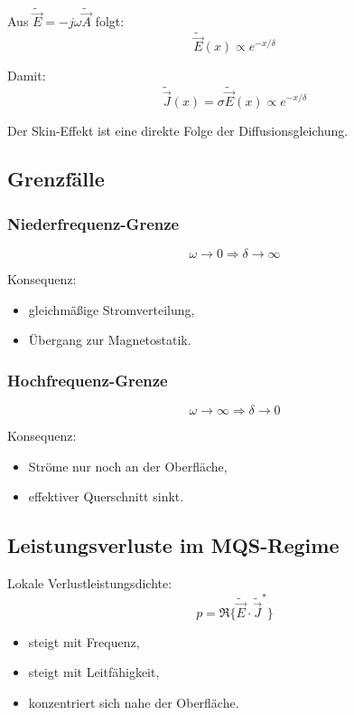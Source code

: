 \documentclass[a4paper]{article}
\newcommand{\E}{\vec E}
\newcommand{\J}{\vec J}
\newcommand{\A}{\vec A}
\begin{document}
Aus $\tilde{\E}=-j\omega\tilde{\A}$ folgt:
\[
\tilde{\E}(x) \propto e^{-x/\delta}
\]

Damit:
\[
\tilde{\J}(x) = \sigma \tilde{\E}(x) \propto e^{-x/\delta}
\]

\begin{schema}
Der Skin-Effekt ist eine direkte Folge der Diffusionsgleichung.
\end{schema}

\subsection{Grenzfälle}

\subsubsection{Niederfrequenz-Grenze}

\[
\omega \to 0 \Rightarrow \delta \to \infty
\]

Konsequenz:
\begin{itemize}
  \item gleichmäßige Stromverteilung,
  \item Übergang zur Magnetostatik.
\end{itemize}

\subsubsection{Hochfrequenz-Grenze}

\[
\omega \to \infty \Rightarrow \delta \to 0
\]

Konsequenz:
\begin{itemize}
  \item Ströme nur noch an der Oberfläche,
  \item effektiver Querschnitt sinkt.
\end{itemize}

\subsection{Leistungsverluste im MQS-Regime}

Lokale Verlustleistungsdichte:
\[
p = \Re\{\tilde{\E}\cdot\tilde{\J}^*\}
\]

\begin{itemize}
  \item steigt mit Frequenz,
  \item steigt mit Leitfähigkeit,
  \item konzentriert sich nahe der Oberfläche.
\end{itemize}
\end{document}
